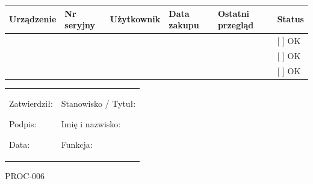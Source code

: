 \documentclass[12pt,a4paper]{article}
\begin{document}
\begin{longtable}[]{@{}>{\raggedright\arraybackslash}p{}>{\raggedright\arraybackslash}p{}>{\raggedright\arraybackslash}p{}>{\raggedright\arraybackslash}p{}>{\raggedright\arraybackslash}p{}>{\raggedright\arraybackslash}p{}@{}}
\toprule\noalign{}
Urządzenie & Nr seryjny & Użytkownik & Data zakupu & Ostatni przegląd &
Status \\
\midrule\noalign{}
\endhead
\bottomrule\noalign{}
\endlastfoot
\underline{\hspace{2cm}} & \underline{\hspace{2cm}} &
\underline{\hspace{2cm}} & \underline{\hspace{2cm}} &
\underline{\hspace{2cm}} & {[} {]} OK \\
\underline{\hspace{2cm}} & \underline{\hspace{2cm}} &
\underline{\hspace{2cm}} & \underline{\hspace{2cm}} &
\underline{\hspace{2cm}} & {[} {]} OK \\
\underline{\hspace{2cm}} & \underline{\hspace{2cm}} &
\underline{\hspace{2cm}} & \underline{\hspace{2cm}} &
\underline{\hspace{2cm}} & {[} {]} OK \\
\end{longtable}

\begin{longtable}[]{@{}
  >{\raggedright\arraybackslash}p{}
  >{\raggedright\arraybackslash}p{}@{}}
\toprule\noalign{}
\endhead
\bottomrule\noalign{}
\endlastfoot
\begin{minipage}[t]{\linewidth}\raggedright
Zatwierdził:

Podpis: \underline{\hspace{3cm}}

Data: \underline{\hspace{4cm}}
\end{minipage} & \begin{minipage}[t]{\linewidth}\raggedright
Stanowisko / Tytuł:

Imię i nazwisko: \underline{\hspace{3cm}}

Funkcja: \underline{\hspace{3cm}}
\end{minipage} \\
\end{longtable}
\newpage
{}\label{doc3}
PROC-006
\end{document}
